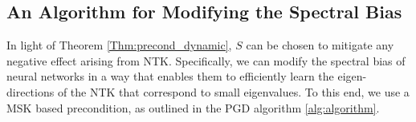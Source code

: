 \documentclass[10pt]{article} %
\theoremstyle{plain}
\newtheorem{lemma}[theorem]{Lemma}
\theoremstyle{definition}
\theoremstyle{remark}
\newcommand{\norm}[1]{\left\lVert#1\right\rVert}
\newcommand{\x}{\mathbf{x}}
\newcommand{\y}{\mathbf{y}}
\newcommand{\hh}{\mathcal{H}}
\newcommand{\kr}{\boldsymbol{k}}
\DeclareMathOperator*{\argmin}{arg\,min}
\newcommand{\rb}[1]{\textcolor{magenta}{[Ronen: #1]}}
\begin{document}

\subsection{An Algorithm for Modifying the Spectral Bias} \label{sec:alg}
In light of Theorem \ref{Thm:precond_dynamic}, $S$ can be chosen to mitigate any negative effect arising from NTK. Specifically, we can modify the spectral bias of neural networks in a way that enables them to efficiently learn the eigen-directions of the NTK that correspond to small eigenvalues. To this end, we use a MSK based precondition, as outlined in the PGD algorithm \ref{alg:algorithm}.
\end{document}
